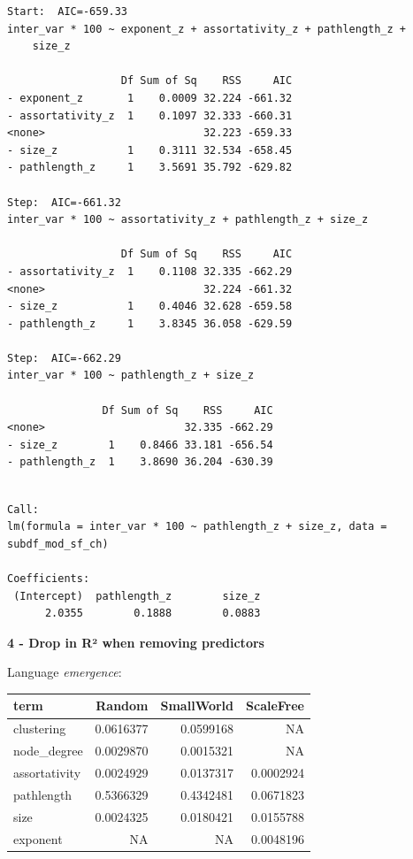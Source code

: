 \documentclass[
]{article}
\begin{document}
\begin{verbatim}
Start:  AIC=-659.33
inter_var * 100 ~ exponent_z + assortativity_z + pathlength_z + 
    size_z

                  Df Sum of Sq    RSS     AIC
- exponent_z       1    0.0009 32.224 -661.32
- assortativity_z  1    0.1097 32.333 -660.31
<none>                         32.223 -659.33
- size_z           1    0.3111 32.534 -658.45
- pathlength_z     1    3.5691 35.792 -629.82

Step:  AIC=-661.32
inter_var * 100 ~ assortativity_z + pathlength_z + size_z

                  Df Sum of Sq    RSS     AIC
- assortativity_z  1    0.1108 32.335 -662.29
<none>                         32.224 -661.32
- size_z           1    0.4046 32.628 -659.58
- pathlength_z     1    3.8345 36.058 -629.59

Step:  AIC=-662.29
inter_var * 100 ~ pathlength_z + size_z

               Df Sum of Sq    RSS     AIC
<none>                      32.335 -662.29
- size_z        1    0.8466 33.181 -656.54
- pathlength_z  1    3.8690 36.204 -630.39
\end{verbatim}

\begin{verbatim}

Call:
lm(formula = inter_var * 100 ~ pathlength_z + size_z, data = subdf_mod_sf_ch)

Coefficients:
 (Intercept)  pathlength_z        size_z  
      2.0355        0.1888        0.0883  
\end{verbatim}

\textbf{4 - Drop in R² when removing predictors}

Language \emph{emergence}:

\begin{longtable}[]{@{}lrrr@{}}
\toprule()
term & Random & SmallWorld & ScaleFree \\
\midrule()
\endhead
clustering & 0.0616377 & 0.0599168 & NA \\
node\_degree & 0.0029870 & 0.0015321 & NA \\
assortativity & 0.0024929 & 0.0137317 & 0.0002924 \\
pathlength & 0.5366329 & 0.4342481 & 0.0671823 \\
size & 0.0024325 & 0.0180421 & 0.0155788 \\
exponent & NA & NA & 0.0048196 \\
\bottomrule()
\end{longtable}
\end{document}
